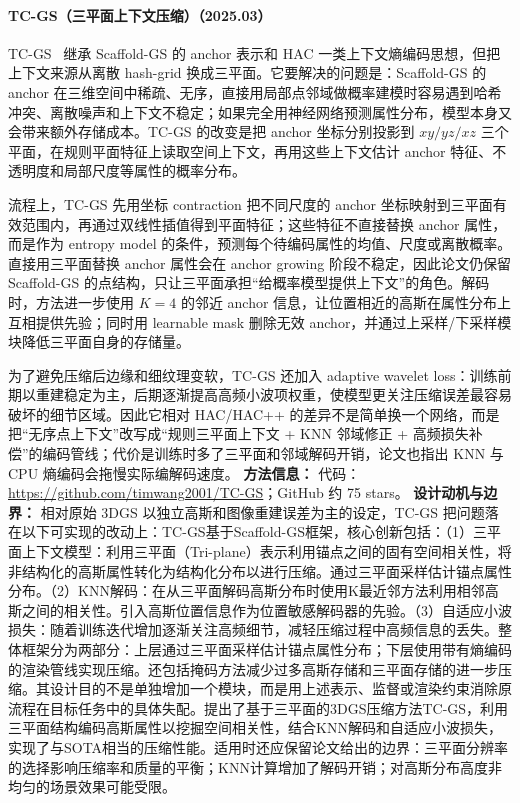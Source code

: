 \paragraph{TC-GS（三平面上下文压缩）（2025.03）}
TC-GS~\cite{2503_20221} 继承 Scaffold-GS 的 anchor 表示和 HAC 一类上下文熵编码思想，但把上下文来源从离散 hash-grid 换成三平面。它要解决的问题是：Scaffold-GS 的 anchor 在三维空间中稀疏、无序，直接用局部点邻域做概率建模时容易遇到哈希冲突、离散噪声和上下文不稳定；如果完全用神经网络预测属性分布，模型本身又会带来额外存储成本。TC-GS 的改变是把 anchor 坐标分别投影到 $xy/yz/xz$ 三个平面，在规则平面特征上读取空间上下文，再用这些上下文估计 anchor 特征、不透明度和局部尺度等属性的概率分布。

流程上，TC-GS 先用坐标 contraction 把不同尺度的 anchor 坐标映射到三平面有效范围内，再通过双线性插值得到平面特征；这些特征不直接替换 anchor 属性，而是作为 entropy model 的条件，预测每个待编码属性的均值、尺度或离散概率。直接用三平面替换 anchor 属性会在 anchor growing 阶段不稳定，因此论文仍保留 Scaffold-GS 的点结构，只让三平面承担“给概率模型提供上下文”的角色。解码时，方法进一步使用 $K=4$ 的邻近 anchor 信息，让位置相近的高斯在属性分布上互相提供先验；同时用 learnable mask 删除无效 anchor，并通过上采样/下采样模块降低三平面自身的存储量。

为了避免压缩后边缘和细纹理变软，TC-GS 还加入 adaptive wavelet loss：训练前期以重建稳定为主，后期逐渐提高高频小波项权重，使模型更关注压缩误差最容易破坏的细节区域。因此它相对 HAC/HAC++ 的差异不是简单换一个网络，而是把“无序点上下文”改写成“规则三平面上下文 + KNN 邻域修正 + 高频损失补偿”的编码管线；代价是训练时多了三平面和邻域解码开销，论文也指出 KNN 与 CPU 熵编码会拖慢实际编解码速度。
\textbf{方法信息：} 代码：\url{https://github.com/timwang2001/TC-GS}；GitHub 约 75 stars。
\textbf{设计动机与边界：} 相对原始 3DGS 以独立高斯和图像重建误差为主的设定，TC-GS 把问题落在以下可实现的改动上：TC-GS基于Scaffold-GS框架，核心创新包括：（1）三平面上下文模型：利用三平面（Tri-plane）表示利用锚点之间的固有空间相关性，将非结构化的高斯属性转化为结构化分布以进行压缩。通过三平面采样估计锚点属性分布。（2）KNN解码：在从三平面解码高斯分布时使用K最近邻方法利用相邻高斯之间的相关性。引入高斯位置信息作为位置敏感解码器的先验。（3）自适应小波损失：随着训练迭代增加逐渐关注高频细节，减轻压缩过程中高频信息的丢失。整体框架分为两部分：上层通过三平面采样估计锚点属性分布；下层使用带有熵编码的渲染管线实现压缩。还包括掩码方法减少过多高斯存储和三平面存储的进一步压缩。其设计目的不是单独增加一个模块，而是用上述表示、监督或渲染约束消除原流程在目标任务中的具体失配。提出了基于三平面的3DGS压缩方法TC-GS，利用三平面结构编码高斯属性以挖掘空间相关性，结合KNN解码和自适应小波损失，实现了与SOTA相当的压缩性能。适用时还应保留论文给出的边界：三平面分辨率的选择影响压缩率和质量的平衡；KNN计算增加了解码开销；对高斯分布高度非均匀的场景效果可能受限。
